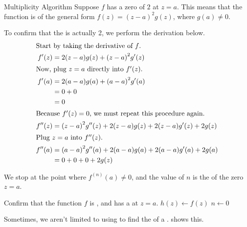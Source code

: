 \begin{example}{Multiplicity Algorithm}
  Suppose $f$ has a zero of  $2$ at $z=a$.
  This means that the function is of the general form $f(z) = {(z-a)}^{2} g(z)$, where $g(a) \neq 0$.

  To confirm that the  is actually 2, we perform the derivation below.
  \begin{align*}
    \shortintertext{Start by taking the derivative of $f$.}
    f'(z) &= 2(z-a) g(z) + {(z-a)}^{2} g'(z) \\
    \shortintertext{Now, plug $z=a$ directly into $f'(z)$.}
    f'(a) &= 2(a-a) g(a) + {(a-a)}^{2} g'(a) \\
          &= 0 + 0 \\
          &= 0 \\
    \intertext{Because $f'(z) = 0$, we must repeat this procedure again.}
    f''(z) &= {(z-a)}^{2} g''(z) + 2(z-a) g(z) + 2(z-a) g'(z) + 2 g(z) \\
    \shortintertext{Plug $z=a$ into $f''(z)$.}
    f''(a) &= {(a-a)}^{2} g''(a) + 2(a-a) g(a) + 2(a-a) g'(a) + 2 g(a) \\
          &= 0 + 0 + 0 + 2 g(z)
  \end{align*}

  We stop at the point where $f^{(n)}(a) \neq 0$, and the value of $n$ is the  of the zero $z=a$.
\end{example}

\begin{algorithm}[H]
  \DontPrintSemicolon{}

  \BlankLine{}

  Confirm that the function $f$ is , and has a  at $z=a$. \;
  $h(z) \leftarrow f(z)$ \;
  $n \longleftarrow 0$ \;

  \caption{Multiplicity}
  \label{algo:Multiplicity}
\end{algorithm}

Sometimes, we aren't limited to using  to find the  of a .
 shows this.

